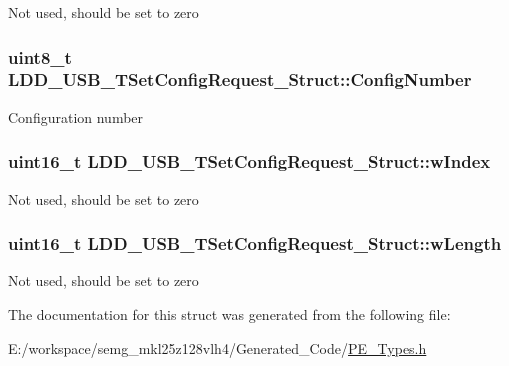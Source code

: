 Not used, should be set to zero \hypertarget{struct_l_d_d___u_s_b___t_set_config_request___struct_a9a545d7858a7ee85dbe37eaf2b4b7e01}{
\subsubsection[{Config\-Number}]{\setlength{\rightskip}{0pt plus 5cm}uint8\-\_\-t L\-D\-D\-\_\-\-U\-S\-B\-\_\-\-T\-Set\-Config\-Request\-\_\-\-Struct\-::\-Config\-Number}}\label{struct_l_d_d___u_s_b___t_set_config_request___struct_a9a545d7858a7ee85dbe37eaf2b4b7e01}
Configuration number \hypertarget{struct_l_d_d___u_s_b___t_set_config_request___struct_ad2aa2851b128777e842b2ac796d2f664}{
\subsubsection[{w\-Index}]{\setlength{\rightskip}{0pt plus 5cm}uint16\-\_\-t L\-D\-D\-\_\-\-U\-S\-B\-\_\-\-T\-Set\-Config\-Request\-\_\-\-Struct\-::w\-Index}}\label{struct_l_d_d___u_s_b___t_set_config_request___struct_ad2aa2851b128777e842b2ac796d2f664}
Not used, should be set to zero \hypertarget{struct_l_d_d___u_s_b___t_set_config_request___struct_a66312977eb5816459d0201a2bacaf9b5}{
\subsubsection[{w\-Length}]{\setlength{\rightskip}{0pt plus 5cm}uint16\-\_\-t L\-D\-D\-\_\-\-U\-S\-B\-\_\-\-T\-Set\-Config\-Request\-\_\-\-Struct\-::w\-Length}}\label{struct_l_d_d___u_s_b___t_set_config_request___struct_a66312977eb5816459d0201a2bacaf9b5}
Not used, should be set to zero 

The documentation for this struct was generated from the following file\-:\begin{DoxyCompactItemize}
\item 
E\-:/workspace/semg\-\_\-mkl25z128vlh4/\-Generated\-\_\-\-Code/\hyperlink{_p_e___types_8h}{P\-E\-\_\-\-Types.\-h}\end{DoxyCompactItemize}
